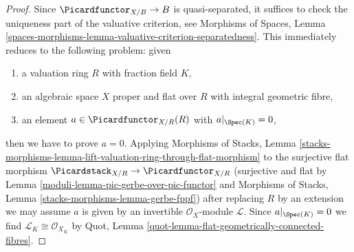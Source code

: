\begin{proof}

Since $\Picardfunctor_{X/B} \to B$ is quasi-separated, it suffices
to check the uniqueness part of the valuative criterion, see
Morphisms of Spaces, Lemma
\ref{spaces-morphisms-lemma-valuative-criterion-separatedness}.
This immediately reduces to the following problem: given
\begin{enumerate}
\item a valuation ring $R$ with fraction field $K$,
\item an algebraic space $X$ proper and flat over $R$
with integral geometric fibre,
\item an element $a \in \Picardfunctor_{X/R}(R)$ with
$a|_{\Spec(K)} = 0$,
\end{enumerate}
then we have to prove $a = 0$. Applying
Morphisms of Stacks, Lemma
\ref{stacks-morphisms-lemma-lift-valuation-ring-through-flat-morphism}
to the surjective flat morphism
$\Picardstack_{X/R} \to \Picardfunctor_{X/R}$
(surjective and flat by Lemma \ref{moduli-lemma-pic-gerbe-over-pic-functor} and
Morphisms of Stacks, Lemma \ref{stacks-morphisms-lemma-gerbe-fppf})
after replacing $R$ by an extension we may assume
$a$ is given by an invertible $\mathcal{O}_X$-module
$\mathcal{L}$. Since $a|_{\Spec(K)} = 0$ we find
$\mathcal{L}_K \cong \mathcal{O}_{X_K}$ by
Quot, Lemma \ref{quot-lemma-flat-geometrically-connected-fibres}.


\end{proof}
